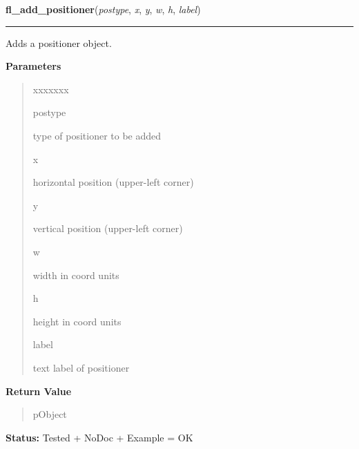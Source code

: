     \label{xformslib:library:fl_add_positioner}

    \vspace{0.5ex}

\hspace{.8\funcindent}\begin{boxedminipage}{\funcwidth}

    \raggedright \textbf{fl\_add\_positioner}(\textit{postype}, \textit{x}, \textit{y}, \textit{w}, \textit{h}, \textit{label})

    \vspace{-1.5ex}

    \rule{\textwidth}{0.5\fboxrule}
\setlength{\parskip}{2ex}
    Adds a positioner object.

\setlength{\parskip}{1ex}
      \textbf{Parameters}
      \vspace{-1ex}

      \begin{quote}
        \begin{Ventry}{xxxxxxx}

          \item[postype]

          type of positioner to be added

          \item[x]

          horizontal position (upper-left corner)

          \item[y]

          vertical position (upper-left corner)

          \item[w]

          width in coord units

          \item[h]

          height in coord units

          \item[label]

          text label of positioner

        \end{Ventry}

      \end{quote}

      \textbf{Return Value}
    \vspace{-1ex}

      \begin{quote}
      pObject

      \end{quote}

\textbf{Status:} Tested + NoDoc + Example = OK



    \end{boxedminipage}

